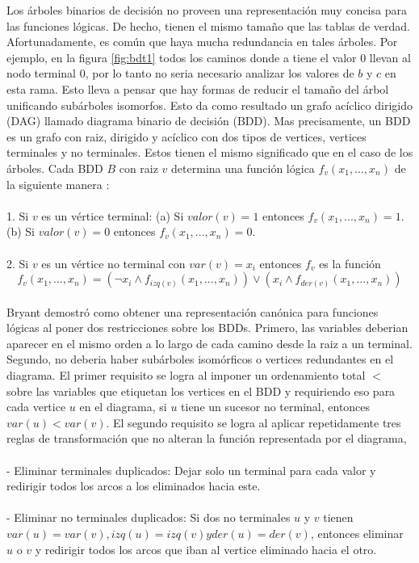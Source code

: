 \noindent Los árboles binarios de decisión no proveen una representación muy concisa para las funciones lógicas. De hecho, tienen el mismo tamaño que las tablas de verdad. Afortunadamente, es común que haya mucha redundancia en tales árboles. Por ejemplo, en la figura \ref{fig:bdt1} todos los caminos donde a tiene el valor 0 llevan al nodo terminal 0, por lo tanto no seria necesario analizar los valores de $b$ y $c$ en esta rama. Esto lleva a pensar que hay formas de reducir el tamaño del árbol unificando subárboles isomorfos. Esto da como resultado un grafo acíclico dirigido (DAG) llamado diagrama binario de decisión (BDD). Mas precisamente, un BDD es un grafo con raiz, dirigido y acíclico con dos tipos de vertices, vertices terminales y no terminales. Estos tienen el mismo significado que en el caso de los árboles. Cada BDD $B$ con raiz $v$ determina una función lógica $f_{v}(x_{1},...,x_{n})$ de la siguiente manera \cite{Clarke:1}:\\
\\
1. Si $v$ es un vértice terminal:
  (a) Si $valor(v) = 1$ entonces $f_{v}(x_{1},...,x_{n}) = 1$.
  (b) Si $valor(v) = 0$ entonces $f_{v}(x_{1},...,x_{n}) = 0$.\\
\\
2. Si $v$ es un vértice no terminal con $var(v) = x_{i}$ entonces $f_{v}$ es la función 
\[f_{v}(x_{1},...,x_{n}) = (\neg x_{i} \land f_{izq(v)}(x_{1},...,x_{n})) \lor (x_{i} \land f_{der(v)}(x_{1},...,x_{n}))\]\\
\noindent Bryant \cite{Bryant:8} demostró como obtener una representación canónica para funciones lógicas al poner dos restricciones sobre los BDDs. Primero, las variables deberian aparecer en el mismo orden a lo largo de cada camino desde la raiz a un terminal. Segundo, no deberia haber subárboles isomórficos o vertices redundantes en el diagrama. El primer requisito se logra al imponer un ordenamiento total $<$ sobre las variables que etiquetan los vertices en el BDD y requiriendo eso para cada vertice $u$ en el diagrama, si $u$ tiene un sucesor no terminal, entonces $var(u) < var(v)$. El segundo requisito se logra al aplicar repetidamente tres reglas de transformación que no alteran la función representada por el diagrama, \\
\\
- Eliminar terminales duplicados: Dejar solo un terminal para cada valor y redirigir todos los arcos a los eliminados hacia este.\\
\\
- Eliminar no terminales duplicados: Si dos no terminales $u$ y $v$ tienen $var(u) = var(v), izq(u) = izq(v) y der(u) = der(v)$, entonces eliminar $u$ o $v$ y redirigir todos los arcos que iban al vertice eliminado hacia el otro.\\
